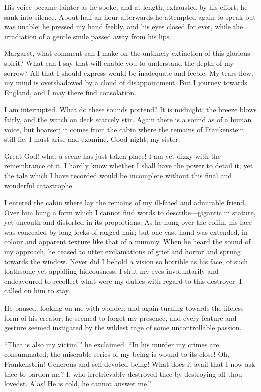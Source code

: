 \documentclass[12pt,openright]{book}
\begin{document}
His voice became fainter as he spoke, and at length, exhausted by his effort, he sank into silence. About half an hour afterwards he attempted again to speak but was unable; he pressed my hand feebly, and his eyes closed for ever, while the irradiation of a gentle smile passed away from his lips.

Margaret, what comment can I make on the untimely extinction of this glorious spirit? What can I say that will enable you to understand the depth of my sorrow? All that I should express would be inadequate and feeble. My tears flow; my mind is overshadowed by a cloud of disappointment. But I journey towards England, and I may there find consolation.

I am interrupted. What do these sounds portend? It is midnight; the breeze blows fairly, and the watch on deck scarcely stir. Again there is a sound as of a human voice, but hoarser; it comes from the cabin where the remains of Frankenstein still lie. I must arise and examine. Good night, my sister.

Great God! what a scene has just taken place! I am yet dizzy with the remembrance of it. I hardly know whether I shall have the power to detail it; yet the tale which I have recorded would be incomplete without this final and wonderful catastrophe.

I entered the cabin where lay the remains of my ill-fated and admirable friend. Over him hung a form which I cannot find words to describe—gigantic in stature, yet uncouth and distorted in its proportions. As he hung over the coffin, his face was concealed by long locks of ragged hair; but one vast hand was extended, in colour and apparent texture like that of a mummy. When he heard the sound of my approach, he ceased to utter exclamations of grief and horror and sprung towards the window. Never did I behold a vision so horrible as his face, of such loathsome yet appalling hideousness. I shut my eyes involuntarily and endeavoured to recollect what were my duties with regard to this destroyer. I called on him to stay.

He paused, looking on me with wonder, and again turning towards the lifeless form of his creator, he seemed to forget my presence, and every feature and gesture seemed instigated by the wildest rage of some uncontrollable passion.

“That is also my victim!” he exclaimed. “In his murder my crimes are consummated; the miserable series of my being is wound to its close! Oh, Frankenstein! Generous and self-devoted being! What does it avail that I now ask thee to pardon me? I, who irretrievably destroyed thee by destroying all thou lovedst. Alas! He is cold, he cannot answer me.”
\end{document}
